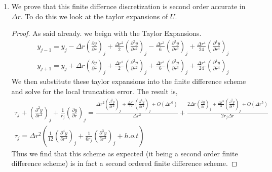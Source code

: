 \documentclass{article}
\begin{document}
\begin{enumerate}[label=\alph*)]

    \item We prove that this finite differnce discretization is second order
    accurate in $\Delta r$. To do this we look at the taylor expansions of $U$. 
    \begin{proof}
        As said already. we beign with the Taylor Expansions.
        \begin{align*}
            y_{j-1} = y_j - \Delta r \left(\frac{\partial y}{\partial r}\right)_j
            + \frac{\Delta r^2}{2}\left(\frac{\partial^2 y}{\partial
            r^2}\right)_j - \frac{\Delta r^3}{6}\left(\frac{\partial^3 y}{\partial
            r^3}\right)_j + \frac{\Delta r^4}{24}\left(\frac{\partial^4 y}{\partial
            r^4}\right)_j\\
            y_{j+1} = y_j + \Delta r \left(\frac{\partial y}{\partial r}\right)_j
            + \frac{\Delta r^2}{2}\left(\frac{\partial^2 y}{\partial
            r^2}\right)_j + \frac{\Delta r^3}{6}\left(\frac{\partial^3 y}{\partial
            r^3}\right)_j + \frac{\Delta r^4}{24}\left(\frac{\partial^4 y}{\partial
            r^4}\right)_j
        \end{align*}
        We then substitute these taylor expansions into the finite difference
        scheme and solve for the local truncation error. The result is, 
        \begin{align*}
            \tau_j +  \left(\frac{\partial^2 y}{\partial
            r^2}\right)_j + \frac{1}{r_j}\left(\frac{\partial y}{\partial
            r}\right)_j = \frac{\Delta r^2\left(\frac{\partial^2 y}{\partial
            r^2}\right)_j + \frac{\Delta r^4}{12}\left(\frac{\partial^4 y}{\partial
            r^4}\right)_j + O(\Delta r^6) }{\Delta r^2} + \frac{ 2\Delta r \left(\frac{\partial y}{
            \partial r}\right)_j + \frac{\Delta r^3}{3}\left(\frac{\partial^3 y}{\partial
            r^3}\right)_j + O(\Delta r^5) }{2r_j\Delta r} \\
            \tau_j = \Delta r^2 \left(\frac{1}{12}\left(\frac{\partial^4 y}{\partial
            r^4}\right)_j + \frac{1}{6r_j}\left(\frac{\partial^3 y}{\partial
            r^3}\right)_j + h.o.t\right)
        \end{align*}
        Thus we find that this scheme as expected (it being a second order
        finite difference scheme) is in fact a second ordered finite difference
        scheme. 
    \end{proof}
\end{enumerate}
\end{document}
